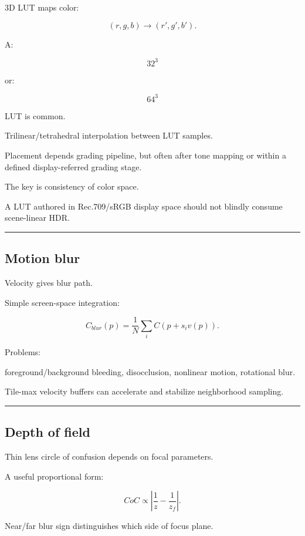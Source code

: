 3D LUT maps color:

\[
(r,g,b)
\rightarrow
(r',g',b').
\]

A:

\[
32^3
\]

or:

\[
64^3
\]

LUT is common.

Trilinear/tetrahedral interpolation between LUT samples.

Placement depends grading pipeline, but often after tone mapping or within a defined display-referred grading stage.

The key is consistency of color space.

A LUT authored in Rec.709/sRGB display space should not blindly consume scene-linear HDR.

\begin{center}\rule{0.5\linewidth}{0.5pt}\end{center}

\subsection{Motion blur}\label{04-visual-computing-ii-ch040-motion-blur}

Velocity gives blur path.

Simple screen-space integration:

\[
C_{blur}(p)
=
\frac1N
\sum_i
C(
p+s_iv(p)
).
\]

Problems:

foreground/background bleeding, disocclusion, nonlinear motion, rotational blur.

Tile-max velocity buffers can accelerate and stabilize neighborhood sampling.

\begin{center}\rule{0.5\linewidth}{0.5pt}\end{center}

\subsection{Depth of field}\label{04-visual-computing-ii-ch040-depth-of-field}

Thin lens circle of confusion depends on focal parameters.

A useful proportional form:

\[
CoC
\propto
\left|
\frac1z-
\frac1{z_f}
\right|.
\]

Near/far blur sign distinguishes which side of focus plane.

